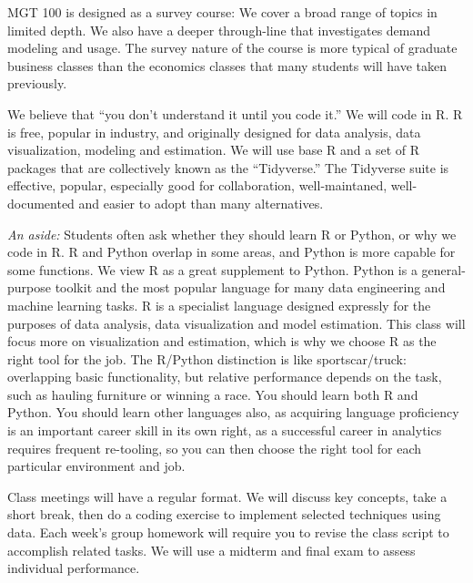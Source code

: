 \documentclass[12pt]{article}
\begin{document}
MGT 100 is designed as a survey course: We cover a broad range of topics in limited depth. We also have a deeper through-line that investigates demand modeling and usage. The survey nature of the course is more typical of graduate business classes than the economics classes that many students will have taken previously.


We believe that ``you don't understand it until you code it.'' We will code in R. R is free, popular in industry, and originally designed for data analysis, data visualization, modeling and estimation. We will use base R and a set of R packages that are collectively known as the ``Tidyverse.'' The Tidyverse suite is effective, popular, especially good for collaboration, well-maintaned, well-documented and easier to adopt than many alternatives. 

{\it An aside:} Students often ask whether they should learn R or Python, or why we code in R. R and Python overlap in some areas, and Python is more capable for some functions. We view R as a great supplement to Python. Python is a general-purpose toolkit and the most popular language for many data engineering and machine learning tasks. R is a specialist language designed expressly for the purposes of data analysis, data visualization and model estimation. This class will focus more on visualization and estimation, which is why we choose R as the right tool for the job. The R/Python distinction is like sportscar/truck: overlapping basic functionality, but relative performance depends on the task, such as hauling furniture or winning a race. You should learn both R and Python. You should learn other languages also, as acquiring language proficiency is an important career skill in its own right, as a successful career in analytics requires frequent re-tooling, so you can then choose the right tool for each particular environment and job. 

Class meetings will have a regular format. We will discuss key concepts, take a short break, then do a coding exercise to implement selected techniques using data. Each week's group homework will require you to revise the class script to accomplish related tasks. We will use a midterm and final exam to assess individual performance.
\end{document}
